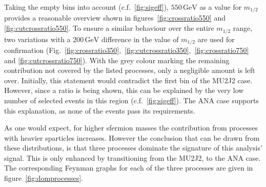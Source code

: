 Taking the empty bins into account (c.f.~\ref{fig:sigeff}), $550\,\text{GeV}$ as a value for $m_{1/2}$ provides a reasonable overview shown in figures~\ref{fig:crossratio550} and \ref{fig:cutcrossratio550}. To ensure a similar behaviour over the entire $m_{1/2}$ range, two variations with a $200\,\text{GeV}$ difference in the value of $m_{1/2}$ are used for confirmation (Fig.~\ref{fig:crossratio350},~\ref{fig:cutcrossratio350},~\ref{fig:crossratio750} and \ref{fig:cutcrossratio750}). With the grey colour marking the remaining contribution not covered by the listed processes, only a negligible amount is left over. Initially, this statement would contradict the first bin of the MU2J2 case. However, since a ratio is being shown, this can be explained by the very low number of selected events in this region (c.f.~\ref{fig:sigeff}). The ANA case supports this explanation, as none of the events pass its requirements.

As one would expect, for higher sfermion masses the contribution from processes with heavier sparticles increases. However the conclusion that can be drawn from these distributions, is that three processes dominate the signature of this analysis' signal. This is only enhanced by transitioning from the MU2J2, to the ANA case. The corresponding Feynman graphs for each of the three processes are given in figure~\ref{fig:domprocesses}.

